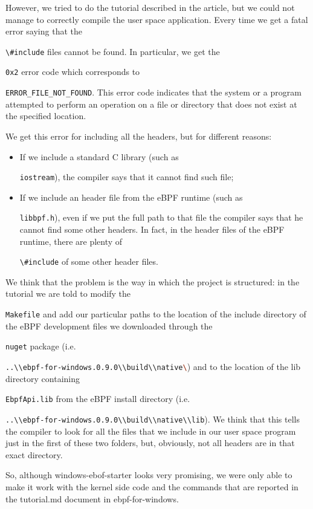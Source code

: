 However, we tried to do the tutorial described in the article, but we could not manage to correctly compile the user space application.
Every time we get a fatal error saying that the  \raggedright\colorbox{backcolour}{\lstinline[style=commandline, language=bash]|\#include|} files cannot be found.
In particular, we get the \raggedright\colorbox{backcolour}{\lstinline[style=commandline, language=bash]|0x2|} error code which corresponds to \raggedright\colorbox{backcolour}{\lstinline[style=commandline, language=bash]|ERROR_FILE_NOT_FOUND|}. 
This error code indicates that the system or a program attempted to perform an operation on a file or directory that does not exist at the specified location.

We get this error for including all the headers, but for different reasons:

\begin{itemize}
	\item 
		If we include a standard C library (such as \raggedright\colorbox{backcolour}{\lstinline[style=commandline, language=bash]|iostream|}), the compiler says that it cannot find such file;
	\item 
		If we include an header file from the eBPF runtime (such as \raggedright\colorbox{backcolour}{\lstinline[style=commandline, language=bash]|libbpf.h|}), even if we put the full path to that file the compiler says that he cannot find some other headers.
		In fact, in the header files of the eBPF runtime, there are plenty of \raggedright\colorbox{backcolour}{\lstinline[style=commandline, language=bash]|\#include|} of some other header files.
\end{itemize}

We think that the problem is the way in which the project is structured: in the tutorial we are told to modify the \raggedright\colorbox{backcolour}{\lstinline[style=commandline, language=bash]|Makefile|} and add our particular paths to the location of the include directory of the eBPF development files we downloaded through the \raggedright\colorbox{backcolour}{\lstinline[style=commandline, language=bash]|nuget|} package (i.e. \raggedright\colorbox{backcolour}{\lstinline[style=commandline, language=bash]|..\\ebpf-for-windows.0.9.0\\build\\native\|}) and to the location of the lib directory containing \raggedright\colorbox{backcolour}{\lstinline[style=commandline, language=bash]|EbpfApi.lib|} from the eBPF install directory (i.e. \raggedright\colorbox{backcolour}{\lstinline[style=commandline, language=bash]|..\\ebpf-for-windows.0.9.0\\build\\native\\lib|}).
We think that this tells the compiler to look for all the files that we include in our user space program just in the first of these two folders, but, obviously, not all headers are in that exact directory.

So, although windows-ebof-starter looks very promising, we were only able to make it work with the kernel side code and the commands that are reported in the tutorial.md document in ebpf-for-windows.

